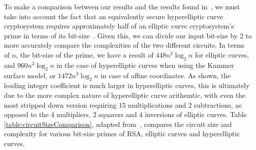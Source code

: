 To make a comparison between our results and the results found in~\cite{roetteler2017quantum}, we must take into account the fact that an equivalently secure hyperelliptic curve cryptosystem requires approximately half of an elliptic curve cryptosystem's prime in terms of its bit-size~\cite{cryptoeprint:2012:670}. Given this, we can divide our input bit-size by 2 to more accurately compare the complexities of the two different circuits. In terms of $n$, the bit-size of the prime, we have a result of  $448n^3\log_2n$ for elliptic curves, and $960n^3\log_2n$ in the case of hyperelliptic curves when using the Kummer surface model, or $1472n^3\log_2n$ in case of affine coordinates. As shown, the leading integer coefficient is much larger in hyperelliptic curves, this is ultimately due to the more complex nature of hyperelliptic curve arithemtic, with even the most stripped down version requiring 15 multiplications and 2 subtractions, as opposed to the 4 multipliers, 2 squarers and 4 inversions of elliptic curves. Table \ref{table:circuitSizeComparison}, adapted from~\cite{roetteler2017quantum}, compares the circuit size and complexity for various bit-size primes of RSA, elliptic curves and hyperelliptic curves.
